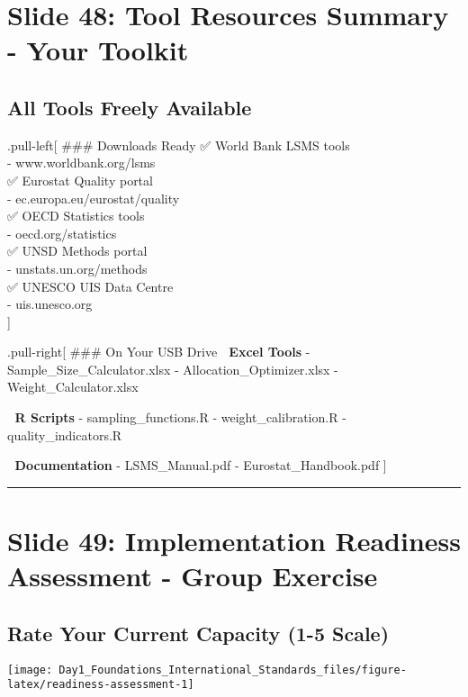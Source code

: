 \documentclass[
]{article}
\begin{document}
\section{Slide 48: Tool Resources Summary - Your
Toolkit}\label{slide-48-tool-resources-summary---your-toolkit}

\subsection{All Tools Freely
Available}\label{all-tools-freely-available}

.pull-left{[} \#\#\# Downloads Ready ✅ World Bank LSMS tools\\
- www.worldbank.org/lsms\\
✅ Eurostat Quality portal\\
- ec.europa.eu/eurostat/quality\\
✅ OECD Statistics tools\\
- oecd.org/statistics\\
✅ UNSD Methods portal\\
- unstats.un.org/methods\\
✅ UNESCO UIS Data Centre\\
- uis.unesco.org\\
{]}

.pull-right{[} \#\#\# On Your USB Drive 📁 \textbf{Excel Tools} -
Sample\_Size\_Calculator.xlsx - Allocation\_Optimizer.xlsx -
Weight\_Calculator.xlsx

📁 \textbf{R Scripts} - sampling\_functions.R - weight\_calibration.R -
quality\_indicators.R

📁 \textbf{Documentation} - LSMS\_Manual.pdf - Eurostat\_Handbook.pdf
{]}

\begin{center}\rule{0.5\linewidth}{0.5pt}\end{center}

\section{Slide 49: Implementation Readiness Assessment - Group
Exercise}\label{slide-49-implementation-readiness-assessment---group-exercise}

\subsection{Rate Your Current Capacity (1-5
Scale)}\label{rate-your-current-capacity-1-5-scale}

\texttt{[image: Day1\_Foundations\_International\_Standards\_files/figure-latex/readiness-assessment-1]}
\end{document}
